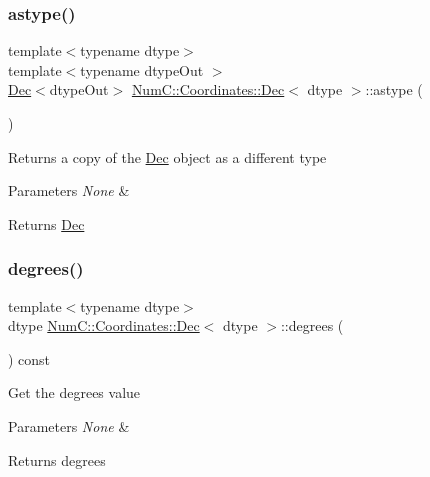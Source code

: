\subsubsection{\texorpdfstring{astype()}{astype()}}
{\footnotesize\ttfamily template$<$typename dtype$>$ \\
template$<$typename dtype\+Out $>$ \\
\mbox{\hyperlink{class_num_c_1_1_coordinates_1_1_dec}{Dec}}$<$dtype\+Out$>$ \mbox{\hyperlink{class_num_c_1_1_coordinates_1_1_dec}{Num\+C\+::\+Coordinates\+::\+Dec}}$<$ dtype $>$\+::astype (\begin{DoxyParamCaption}{ }\end{DoxyParamCaption})\hspace{0.3cm}{\ttfamily [inline]}}

Returns a copy of the \mbox{\hyperlink{class_num_c_1_1_coordinates_1_1_dec}{Dec}} object as a different type


\begin{DoxyParams}{Parameters}
{\em None} & \\
\hline
\end{DoxyParams}
\begin{DoxyReturn}{Returns}
\mbox{\hyperlink{class_num_c_1_1_coordinates_1_1_dec}{Dec}} 
\end{DoxyReturn}
\mbox{\label{class_num_c_1_1_coordinates_1_1_dec_a03ea596ee39499e2f2b988c79b7340d3}} 
\subsubsection{\texorpdfstring{degrees()}{degrees()}}
{\footnotesize\ttfamily template$<$typename dtype$>$ \\
dtype \mbox{\hyperlink{class_num_c_1_1_coordinates_1_1_dec}{Num\+C\+::\+Coordinates\+::\+Dec}}$<$ dtype $>$\+::degrees (\begin{DoxyParamCaption}{ }\end{DoxyParamCaption}) const\hspace{0.3cm}{\ttfamily [inline]}}

Get the degrees value


\begin{DoxyParams}{Parameters}
{\em None} & \\
\hline
\end{DoxyParams}
\begin{DoxyReturn}{Returns}
degrees 
\end{DoxyReturn}
\mbox{\label{class_num_c_1_1_coordinates_1_1_dec_a060d73cb1ff0003123bc30355de7b3ac}} 
